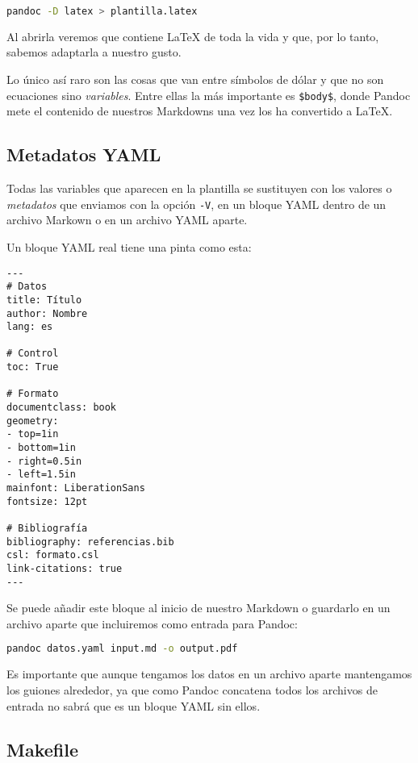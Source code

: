 \begin{lstlisting}[language=bash]
pandoc -D latex > plantilla.latex
\end{lstlisting}

Al abrirla veremos que contiene LaTeX de toda la vida y que, por lo
tanto, sabemos adaptarla a nuestro gusto.

Lo único así raro son las cosas que van entre símbolos de dólar y que no
son ecuaciones sino \emph{variables}. Entre ellas la más importante es
\lstinline!$body$!, donde Pandoc mete el contenido de nuestros Markdowns
una vez los ha convertido a LaTeX.

\subsection{Metadatos YAML}

Todas las variables que aparecen en la plantilla se sustituyen con los
valores o \emph{metadatos} que enviamos con la opción \lstinline!-V!, en
un bloque YAML dentro de un archivo Markown o en un archivo YAML aparte.

Un bloque YAML real tiene una pinta como esta:

\begin{lstlisting}
---
# Datos
title: Título
author: Nombre
lang: es

# Control
toc: True

# Formato
documentclass: book
geometry:
- top=1in
- bottom=1in
- right=0.5in
- left=1.5in
mainfont: LiberationSans
fontsize: 12pt

# Bibliografía
bibliography: referencias.bib
csl: formato.csl
link-citations: true
---
\end{lstlisting}

Se puede añadir este bloque al inicio de nuestro Markdown o guardarlo en
un archivo aparte que incluiremos como entrada para Pandoc:

\begin{lstlisting}[language=bash]
pandoc datos.yaml input.md -o output.pdf
\end{lstlisting}

Es importante que aunque tengamos los datos en un archivo aparte
mantengamos los guiones alrededor, ya que como Pandoc concatena todos
los archivos de entrada no sabrá que es un bloque YAML sin ellos.

\subsection{Makefile}

